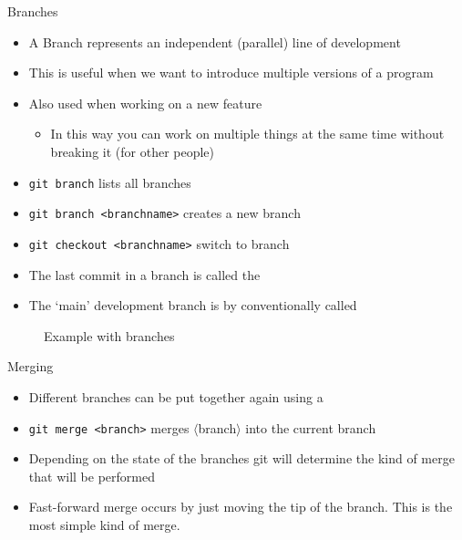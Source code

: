 \documentclass[12pt]{beamer}
\begin{document}
\begin{frame}[fragile]{Branches}
\begin{itemize}
\item A Branch represents an independent (parallel) line of development
\item This is useful when we want to introduce multiple versions of a program
\item Also used when working on a new feature
\begin{itemize}
\item In this way you can work on multiple things at the same time without breaking it (for other people)
\end{itemize}
\item \texttt{git branch} lists all branches
\item \texttt{git branch <branchname>} creates a new branch
\item \texttt{git checkout <branchname>} switch to branch
\item The last commit in a branch is called the \textbf{}
\item The `main' development branch is by conventionally called 
\end{itemize}

\end{frame}

\begin{frame}
	\begin{figure}
     \caption{Example with branches}
\end{figure}
\end{frame}

\begin{frame}[fragile]{Merging}
\begin{itemize}
\item Different branches can be put together again using a \textbf{}
\item \texttt{git merge <branch>} merges $\langle$branch$\rangle$ into the current branch
\item Depending on the state of the branches git will determine the kind of merge that will be performed
\item Fast-forward merge occurs by just moving the tip of the branch. This is the most simple kind of merge.
\end{itemize}
\end{frame}
\end{document}
